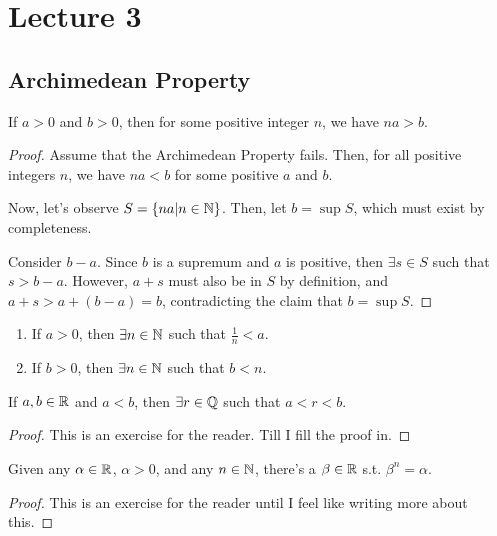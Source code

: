 \documentclass{book}
\begin{document}
\newpage
\section{Lecture 3}
\subsection{Archimedean Property}
\begin{thm}
    If $a > 0$ and $b > 0$, then for some positive integer $n$, we have $na > b$.
\end{thm}

\begin{proof}
    Assume that the Archimedean Property fails. Then, for all positive integers $n$, we have $na < b$ for some positive $a$ and $b$. 

    Now, let's observe $S = \{na | n \in \mathbb{N}\}$. Then, let $b = \sup S$, which must exist by completeness.

    Consider $b - a$. Since $b$ is a supremum and $a$ is positive, then $\exists s \in S$ such that $s > b - a$. However, $a + s$ must also be in $S$ by definition, and $a + s > a + (b - a) = b$, contradicting the claim that $b = \sup S$.
\end{proof}

\begin{corollary}
    \begin{enumerate}
        \item If $a > 0$, then $\exists n \in \mathbb{N}$ such that $\frac{1}{n} < a$.
        \item If $b > 0$, then $\exists n \in \mathbb{N}$ such that $b < n$.
    \end{enumerate}
\end{corollary}

\begin{thm}[Density of $\QQ$]
    If $a, b \in \mathbb{R}$ and $a < b$, then $\exists r \in \mathbb{Q}$ such that $a < r < b$.
\end{thm}

\begin{proof}
    This is an exercise for the reader. Till I fill the proof in.
\end{proof}

\begin{thm}
    Given any $\alpha \in \mathbb{R}$, $\alpha > 0$, and any $n \in \mathbb{N}$, there's a $\beta \in \mathbb{R}$ s.t. $\beta^n = \alpha$.
\end{thm}

\begin{proof}
    This is an exercise for the reader until I feel like writing more about this.
\end{proof}
\end{document}
